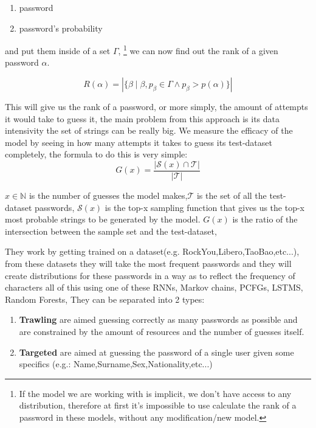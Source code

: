 \documentclass[english,noexaminfo,a4paper,oneside, binding = 0.6cm]{sapthesis}
\begin{document}
\begin{enumerate}
  \item password
  \item password's probability
\end{enumerate}

and put them inside of a set $\Gamma$, \footnote{If the model we are working with is implicit, we don't have access to any distribution, therefore at first it's impossible to use calculate the rank of a password in these models, without any modification/new model.}
we can now find out the rank of a given password $\alpha$.

\begin{equation}
  R(\alpha) = |\{\beta \mid \beta,p_\beta \in \Gamma \wedge p_\beta > p(\alpha) \}|
  \label{eq:fullrank}
\end{equation}

This will give us the rank of a password, or more simply, the amount of attempts it would take to guess it, the main problem from this approach is its data intensivity the set of strings can be really big. 
We measure the efficacy of the model by seeing in how many attempts it takes to guess its test-dataset completely, the formula to do this is very simple:
\begin{equation}
  G(x) = \frac{|\mathcal{S}(x) \cap \mathcal{T}|}{|\mathcal{T}|}
\label{eq:guessratio}
\end{equation}

$x \in \mathds{N}$ is the number of guesses the model makes,$\mathcal{T}$ is the set of all the test-dataset passwords, 
$\mathcal{S}(x)$ is the top-x sampling function that gives us the top-x most probable strings to be generated by the model.
$G(x)$ is the ratio of the intersection between the sample set and the test-dataset,

They work by getting trained on a dataset(e.g. RockYou,Libero,TaoBao,etc...), from these datasets they will take the most frequent passwords and they will create distributions for these passwords in a way as to reflect the frequency of characters
all of this using one of these RNNs, Markov chains, PCFGs, LSTMS, Random Forests\cite{ref:rfguess},
They can be separated into 2 types:

\begin{enumerate}
    \item \textbf{ Trawling} are aimed guessing correctly as many passwords as possible\cite{ref:pwdguessllm} and are constrained  by the amount of resources and the number of guesses itself.
    \item \textbf{ Targeted  }are aimed at guessing the password of a single user given some specifics (e.g.: Name,Surname,Sex,Nationality,etc...)
\end{enumerate}
\end{document}
